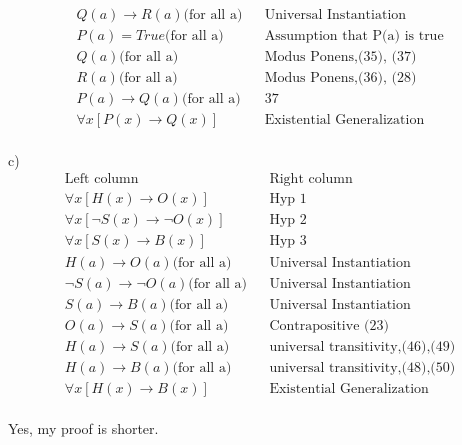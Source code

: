 \documentclass[12pt]{article}
\begin{document}
\begin{enumerate}
\begin{align}
      Q(a) \rightarrow R(a) \textrm{(for all a)} && \textrm{Universal Instantiation} \\
      P(a) = True \textrm{(for all a)} && \textrm{Assumption that P(a) is true} \\ 
      Q(a) \textrm{(for all a)} && \textrm{Modus Ponens,(35), (37)} \\
      R(a) \textrm{(for all a)} && \textrm{Modus Ponens,(36), (28)} \\
      P(a) \rightarrow Q(a) \textrm{(for all a)}  && \textrm{37} \\
      \forall x[P(x) \rightarrow Q(x)] && \textrm{Existential Generalization} 
\end{align} \\
c)	\\
\begin{align}
\textrm{Left column} && \textrm{Right column} \\
      \forall x[H(x) \rightarrow O(x)] && \textrm{Hyp 1} \\
  	  \forall x [\lnot S(x) \rightarrow \lnot O(x)] && \textrm{Hyp 2} \\
      \forall x [S(x) \rightarrow B(x)] && \textrm{Hyp 3} \\
      H(a) \rightarrow O(a) \textrm{(for all a)} && \textrm{Universal Instantiation} \\
      \lnot S(a) \rightarrow \lnot O(a) \textrm{(for all a)} && \textrm{Universal Instantiation} \\
      S(a) \rightarrow B(a) \textrm{(for all a)} && \textrm{Universal Instantiation} \\
      O(a) \rightarrow S(a) \textrm{(for all a)} &&  \textrm{Contrapositive (23)} \\
      H(a) \rightarrow S(a) \textrm{(for all a)} && \textrm{universal transitivity,(46),(49)} \\ 
      H(a) \rightarrow B(a) \textrm{(for all a)} && \textrm{universal transitivity,(48),(50)} \\
      \forall x[H(x) \rightarrow B(x)] && \textrm{Existential Generalization} 
\end{align} \\
Yes, my proof is shorter. 



\end{enumerate}
\end{document}
